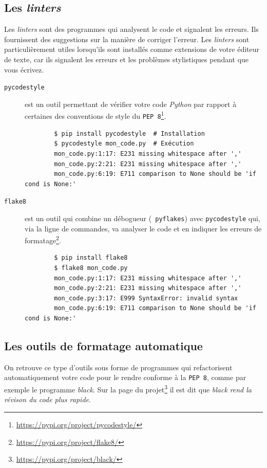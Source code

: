\documentclass[a4paper,11pt]{book}
\begin{document}
\subsection*{Les \textit{linters}}
Les \textit{linters} sont des programmes qui analysent le code et signalent les erreurs. Ils fournissent des suggestions sur la manière de corriger l'erreur. Les \textit{linters} sont particulièrement utiles lorsqu'ils sont installés comme extensions de votre éditeur de texte, car ils signalent les erreurs et les problèmes stylistiques pendant que vous écrivez.
\medskip

\begin{description}
	\item[\texttt{pycodestyle}] est un outil permettant de vérifier votre code \textit{Python} par rapport à certaines des conventions de style du \texttt{PEP 8}\footnote{\url{https://pypi.org/project/pycodestyle/}}.
	\begin{verbatim}
	    $ pip install pycodestyle  # Installation
	    $ pycodestyle mon_code.py  # Exécution
	    mon_code.py:1:17: E231 missing whitespace after ','
	    mon_code.py:2:21: E231 missing whitespace after ','
	    mon_code.py:6:19: E711 comparison to None should be 'if cond is None:'
	\end{verbatim}
	\item[\texttt{flake8}] est un outil qui combine un débogueur (\texttt{ pyflakes}) avec \texttt{pycodestyle} qui, via la ligne de commandes, va analyser le code et en indiquer les erreurs de formatage\footnote{\url{https://pypi.org/project/flake8/}}.
	\begin{verbatim}
	    $ pip install flake8
	    $ flake8 mon_code.py
	    mon_code.py:1:17: E231 missing whitespace after ','
	    mon_code.py:2:21: E231 missing whitespace after ','
	    mon_code.py:3:17: E999 SyntaxError: invalid syntax
	    mon_code.py:6:19: E711 comparison to None should be 'if cond is None:'
	\end{verbatim}
\end{description}
\medskip

\subsection*{Les outils de formatage automatique}
On retrouve ce type d'outils sous forme de programmes qui refactorisent automatiquement votre code pour le rendre conforme à la \texttt{PEP 8}, comme par exemple le programme \textit{black}. Sur la page du projet\footnote{\url{https://pypi.org/project/black/}} il est dit que \textit{black} \og \textit{rend la révison du code plus rapide}\fg{}.
\medskip
\end{document}
